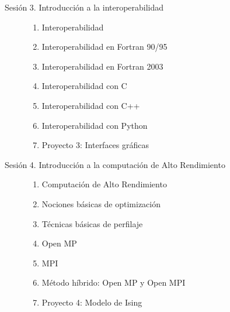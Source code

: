 \begin{description}
  \item[Sesión 3. Introducción a la interoperabilidad]\hfill
    \begin{enumerate}
      \item Interoperabilidad
      \item Interoperabilidad en Fortran 90/95
      \item Interoperabilidad en Fortran 2003
      \item Interoperabilidad con C
      \item Interoperabilidad con C++
      \item Interoperabilidad con Python
      \item Proyecto 3: Interfaces gráficas
    \end{enumerate}

  \item[Sesión 4. Introducción a la computación de Alto Rendimiento]\hfill
    \begin{enumerate}
      \item Computación de Alto Rendimiento
      \item Nociones básicas de optimización
      \item Técnicas básicas de perfilaje
      \item Open MP
      \item MPI
      \item Método híbrido: Open MP y Open MPI
      \item Proyecto 4: Modelo de Ising
    \end{enumerate}
\end{description}
